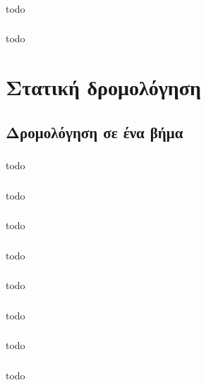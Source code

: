 \documentclass[a4paper, 12pt]{article}
\begin{document}
		\subsubsection{}
			todo

		\subsubsection{}
			todo

\section{Στατική δρομολόγηση}

	\subsection{Δρομολόγηση σε ένα βήμα}

		\subsubsection{}
			todo

		\subsubsection{}
			todo

		\subsubsection{}
			todo

		\subsubsection{}
			todo

		\subsubsection{}
			todo

		\subsubsection{}
			todo

		\subsubsection{}
			todo

		\subsubsection{}
			todo
\end{document}
